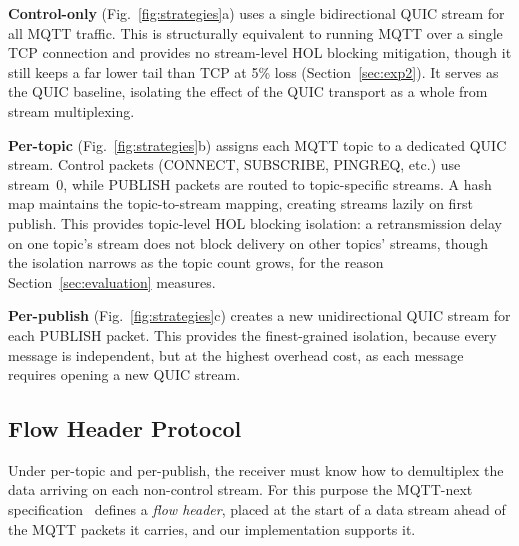 \documentclass[a4paper,fleqn]{cas-dc}
\begin{document}
\textbf{Control-only} (Fig.~\ref{fig:strategies}a) uses a single bidirectional QUIC stream for all MQTT traffic. This is structurally equivalent to running MQTT over a single TCP connection and provides no stream-level HOL blocking mitigation, though it still keeps a far lower tail than TCP at 5\% loss (Section~\ref{sec:exp2}). It serves as the QUIC baseline, isolating the effect of the QUIC transport as a whole from stream multiplexing.

\textbf{Per-topic} (Fig.~\ref{fig:strategies}b) assigns each MQTT topic to a dedicated QUIC stream. Control packets (CONNECT, SUBSCRIBE, PINGREQ, etc.) use stream~0, while PUBLISH packets are routed to topic-specific streams. A hash map maintains the topic-to-stream mapping, creating streams lazily on first publish. This provides topic-level HOL blocking isolation: a retransmission delay on one topic's stream does not block delivery on other topics' streams, though the isolation narrows as the topic count grows, for the reason Section~\ref{sec:evaluation} measures.

\textbf{Per-publish} (Fig.~\ref{fig:strategies}c) creates a new unidirectional QUIC stream for each PUBLISH packet. This provides the finest-grained isolation, because every message is independent, but at the highest overhead cost, as each message requires opening a new QUIC stream.

\subsection{Flow Header Protocol}

Under per-topic and per-publish, the receiver must know how to demultiplex the data arriving on each non-control stream. For this purpose the MQTT-next specification~\cite{yang2024mqttnext} defines a \emph{flow header}, placed at the start of a data stream ahead of the MQTT packets it carries, and our implementation supports it.
\end{document}
